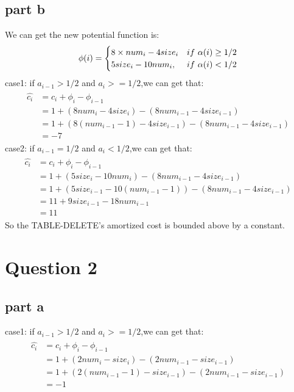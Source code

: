 \documentclass[paper=a4, fontsize=11pt]{scrartcl} %
\numberwithin{equation}{section} %
\numberwithin{figure}{section} %
\numberwithin{table}{section} %
\begin{document}
\subsection{\textbf{part b}}
We can get the new potential function is:\\
$$\phi(i) = \begin{cases}
8 \times num_{i} - 4size_{i} & if \ \alpha(i) \geq 1/2  \cr 5size_{i} - 10num_{i}, &if \ \alpha(i) < 1/2\end{cases}$$
case1: if $a_{i-1}>1/2$ and $a_i>=1/2$,we can get that:\\
\begin{align*}
\begin{split}
\hat{c_i}&=c_i+\phi_i-\phi_{i-1}\\
         &=1+(8num_i-4size_i)-(8num_{i-1}-4size_{i-1})\\
         &=1+(8(num_{i-1}-1)-4size_{i-1})-(8num_{i-1}-4 size_{i-1})\\
         &=-7
\end{split}
\end{align*}
case2: if $a_{i-1}=1/2$ and $a_i<1/2$,we can get that:\\
\begin{align*}
\begin{split}
\hat{c_i}&=c_i+\phi_i-\phi_{i-1}\\
         &=1+(5size_i-10num_i)-(8num_{i-1}-4size_{i-1})\\
         &=1+(5size_{i-1}-10(num_{i-1}-1))-(8num_{i-1}-4size_{i-1})\\
         &=11+9size_{i-1}-18num_{i-1}\\
         &=11
\end{split}
\end{align*}
So the TABLE-DELETE's amortized cost is bounded above by a constant.

\vspace{2cm}
\section{\textbf{Question 2}}
\subsection{\textbf{part a}}
case1: if $a_{i-1}>1/2$ and $a_i>=1/2$,we can get that:
\begin{align*}
\begin{split}
\hat{c_i}&=c_i+\phi_i-\phi_{i-1}\\
         &=1+(2num_i-size_i)-(2num_{i-1}-size_{i-1})\\
         &=1+(2(num_{i-1}-1)-size_{i-1})-(2num_{i-1}-size_{i-1})\\
         &=-1
\end{split}
\end{align*}
\end{document}
